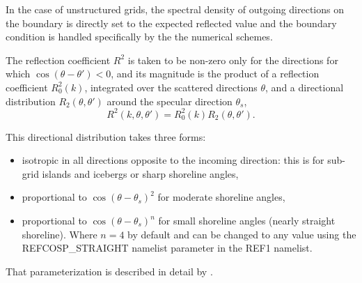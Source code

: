 In the case of unstructured grids, the spectral density of outgoing directions
on the boundary is directly set to the expected reflected value and the
boundary condition is handled specifically by the the numerical schemes.

The reflection coefficient $R^2$ is taken to be non-zero only for the
directions for which $\cos(\theta-\theta')<0$, and its magnitude is the
product of a reflection coefficient $R_0^2(k)$, integrated over the scattered
directions $\theta$, and a directional distribution $R_2(\theta,\theta')$
around the specular direction $\theta_s$,
\begin{equation} 
R^2(k,\theta,\theta')  =  R_0^2(k) R_2(\theta,\theta').
\end{equation}

This directional distribution takes three forms: 
\begin{itemize}

\item isotropic in all directions opposite to the incoming direction: this is
      for sub-grid islands and icebergs or sharp shoreline angles, 

\item proportional to $\cos(\theta-\theta_s)^2$ for moderate shoreline angles,

\item proportional to $\cos(\theta-\theta_s)^n$ for small shoreline angles
      (nearly straight shoreline). Where $n=4$ by default and can be changed
      to any value using the REFCOSP\_STRAIGHT namelist parameter in the REF1
      namelist.

\end{itemize}

\noindent
That parameterization is described in detail by \cite{art:AR12}.